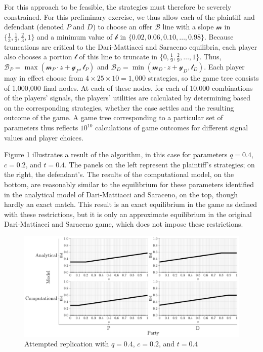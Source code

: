 \documentclass{article}
\begin{document}
For this approach to be feasible, the strategies must therefore be severely constrained. For this preliminary exercise, we thus allow each of the plaintiff and defendant (denoted $P$ and $D$) to choose an offer $\mathcal{B}$ line with a slope $\mathcal{m}$ in $\{ \frac{1}{3}, \frac{1}{2}, \frac{2}{3}, 1 \}$ and a minimum value of $\mathcal{b}$ in $\{0.02, 0.06, 0.10, \ldots, 0.98\}$. Because truncations are critical to the Dari-Mattiacci and Saraceno equilibria, each player also chooses a portion $\mathcal{t}$ of this line to truncate in $\{0, \frac{1}{9}, \frac{2}{9}, \ldots, 1\}$. Thus, $\mathcal{B}_P = \max(\mathcal{m}_P \cdot z + \mathcal{y}_P , \mathcal{t}_P)$  and $\mathcal{B}_D = \min(\mathcal{m}_D \cdot z + \mathcal{y}_D , \mathcal{t}_D)$. Each player may in effect choose from $4 \times 25 \times 10 = 1,000$ strategies, so the game tree consists of 1,000,000 final nodes. At each of these nodes, for each of 10,000 combinations of the players' signals, the players' utilities are calculated by determining based on the corresponding strategies, whether the case settles and the resulting outcome of the game. A game tree corresponding to a particular set of parameters thus reflects $10^{10}$ calculations of game outcomes for different signal values and player choices.

Figure \ref{fig:replication1} illustrates a result of the algorithm, in this case for parameters $q = 0.4$, $c = 0.2$, and $t = 0.4$. The panels on the left represent the plaintiff's strategies; on the right, the defendant's. The results of the computational model, on the bottom, are reasonably similar to the equilibrium for these parameters identified in the analytical model of Dari-Mattiacci and Saraceno, on the top, though hardly an exact match. This result is an exact equilibrium in the game as defined with these restrictions, but it is only an approximate equilibrium in the original Dari-Mattiacci and Saraceno game, which does not impose these restrictions. 

\begin{figure}[h!]
\centering
\includegraphics[scale=0.52, trim={0in 0in 0in 0in}, clip]{../Figures/replication1.pdf}
\caption{Attempted replication with $q = 0.4$, $c = 0.2$, and $t = 0.4$}
\label{fig:replication1}
\end{figure}
\end{document}
